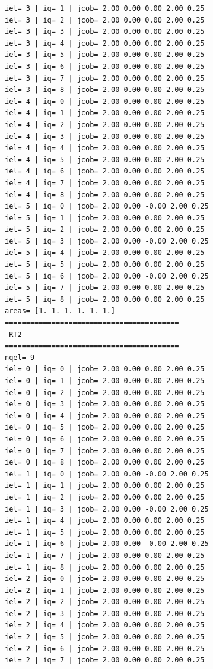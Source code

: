 \begin{tiny}
\begin{verbatim}
iel= 3 | iq= 1 | jcob= 2.00 0.00 0.00 2.00 0.25
iel= 3 | iq= 2 | jcob= 2.00 0.00 0.00 2.00 0.25
iel= 3 | iq= 3 | jcob= 2.00 0.00 0.00 2.00 0.25
iel= 3 | iq= 4 | jcob= 2.00 0.00 0.00 2.00 0.25
iel= 3 | iq= 5 | jcob= 2.00 0.00 0.00 2.00 0.25
iel= 3 | iq= 6 | jcob= 2.00 0.00 0.00 2.00 0.25
iel= 3 | iq= 7 | jcob= 2.00 0.00 0.00 2.00 0.25
iel= 3 | iq= 8 | jcob= 2.00 0.00 0.00 2.00 0.25
iel= 4 | iq= 0 | jcob= 2.00 0.00 0.00 2.00 0.25
iel= 4 | iq= 1 | jcob= 2.00 0.00 0.00 2.00 0.25
iel= 4 | iq= 2 | jcob= 2.00 0.00 0.00 2.00 0.25
iel= 4 | iq= 3 | jcob= 2.00 0.00 0.00 2.00 0.25
iel= 4 | iq= 4 | jcob= 2.00 0.00 0.00 2.00 0.25
iel= 4 | iq= 5 | jcob= 2.00 0.00 0.00 2.00 0.25
iel= 4 | iq= 6 | jcob= 2.00 0.00 0.00 2.00 0.25
iel= 4 | iq= 7 | jcob= 2.00 0.00 0.00 2.00 0.25
iel= 4 | iq= 8 | jcob= 2.00 0.00 0.00 2.00 0.25
iel= 5 | iq= 0 | jcob= 2.00 0.00 -0.00 2.00 0.25
iel= 5 | iq= 1 | jcob= 2.00 0.00 0.00 2.00 0.25
iel= 5 | iq= 2 | jcob= 2.00 0.00 0.00 2.00 0.25
iel= 5 | iq= 3 | jcob= 2.00 0.00 -0.00 2.00 0.25
iel= 5 | iq= 4 | jcob= 2.00 0.00 0.00 2.00 0.25
iel= 5 | iq= 5 | jcob= 2.00 0.00 0.00 2.00 0.25
iel= 5 | iq= 6 | jcob= 2.00 0.00 -0.00 2.00 0.25
iel= 5 | iq= 7 | jcob= 2.00 0.00 0.00 2.00 0.25
iel= 5 | iq= 8 | jcob= 2.00 0.00 0.00 2.00 0.25
areas= [1. 1. 1. 1. 1. 1.]
=========================================
 RT2
=========================================
nqel= 9
iel= 0 | iq= 0 | jcob= 2.00 0.00 0.00 2.00 0.25
iel= 0 | iq= 1 | jcob= 2.00 0.00 0.00 2.00 0.25
iel= 0 | iq= 2 | jcob= 2.00 0.00 0.00 2.00 0.25
iel= 0 | iq= 3 | jcob= 2.00 0.00 0.00 2.00 0.25
iel= 0 | iq= 4 | jcob= 2.00 0.00 0.00 2.00 0.25
iel= 0 | iq= 5 | jcob= 2.00 0.00 0.00 2.00 0.25
iel= 0 | iq= 6 | jcob= 2.00 0.00 0.00 2.00 0.25
iel= 0 | iq= 7 | jcob= 2.00 0.00 0.00 2.00 0.25
iel= 0 | iq= 8 | jcob= 2.00 0.00 0.00 2.00 0.25
iel= 1 | iq= 0 | jcob= 2.00 0.00 -0.00 2.00 0.25
iel= 1 | iq= 1 | jcob= 2.00 0.00 0.00 2.00 0.25
iel= 1 | iq= 2 | jcob= 2.00 0.00 0.00 2.00 0.25
iel= 1 | iq= 3 | jcob= 2.00 0.00 -0.00 2.00 0.25
iel= 1 | iq= 4 | jcob= 2.00 0.00 0.00 2.00 0.25
iel= 1 | iq= 5 | jcob= 2.00 0.00 0.00 2.00 0.25
iel= 1 | iq= 6 | jcob= 2.00 0.00 -0.00 2.00 0.25
iel= 1 | iq= 7 | jcob= 2.00 0.00 0.00 2.00 0.25
iel= 1 | iq= 8 | jcob= 2.00 0.00 0.00 2.00 0.25
iel= 2 | iq= 0 | jcob= 2.00 0.00 0.00 2.00 0.25
iel= 2 | iq= 1 | jcob= 2.00 0.00 0.00 2.00 0.25
iel= 2 | iq= 2 | jcob= 2.00 0.00 0.00 2.00 0.25
iel= 2 | iq= 3 | jcob= 2.00 0.00 0.00 2.00 0.25
iel= 2 | iq= 4 | jcob= 2.00 0.00 0.00 2.00 0.25
iel= 2 | iq= 5 | jcob= 2.00 0.00 0.00 2.00 0.25
iel= 2 | iq= 6 | jcob= 2.00 0.00 0.00 2.00 0.25
iel= 2 | iq= 7 | jcob= 2.00 0.00 0.00 2.00 0.25

\end{verbatim}
\end{tiny}
